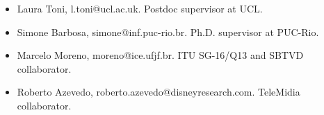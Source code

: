 \documentclass[10pt,a4paper,sans,colorlinks]{moderncv}
\begin{document}
\begin{itemize}
    \item Laura Toni, l.toni@ucl.ac.uk. Postdoc supervisor at UCL.
    \item Simone Barbosa, simone@inf.puc-rio.br. Ph.D. supervisor at PUC-Rio.
    \item Marcelo Moreno, moreno@ice.ufjf.br. ITU SG-16/Q13 and SBTVD collaborator.
    \item Roberto Azevedo, roberto.azevedo@disneyresearch.com. TeleMidia collaborator.
\end{itemize}
\end{document}
